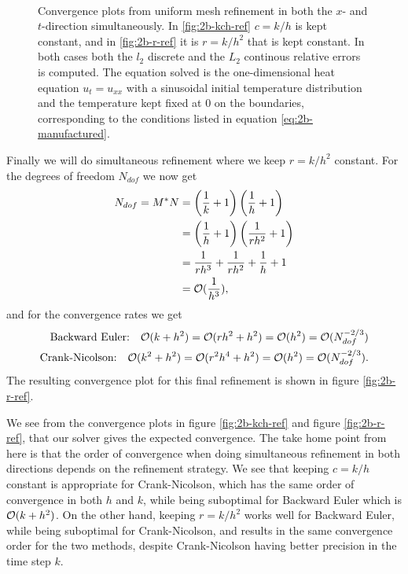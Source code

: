 \begin{figure}
    \centering
    \subfloat[Convergence plots from uniform refinement with constant $c=k/h$.]{
        
        \label{fig:2b-kch-ref}
    } \\ \medskip
    \subfloat[Convergence plots from uniform refinement with constant $r=k/h^2$.]{
        
        \label{fig:2b-r-ref}
    }
    \caption{
        Convergence plots from uniform mesh refinement in both the $x$- and $t$-direction simultaneously. 
        In \ref{fig:2b-kch-ref} $c=k/h$ is kept constant, 
        and in \ref{fig:2b-r-ref} it is $r=k/h^2$ that is kept constant. 
        In both cases both the $l_2$ discrete and the $L_2$ continous relative errors is computed. 
        The equation solved is the one-dimensional heat equation $u_t=u_{xx}$ 
        with a sinusoidal initial temperature distribution and the temperature kept fixed at $0$ 
        on the boundaries, 
        corresponding to the conditions listed in equation \eqref{eq:2b-manufactured}. 
    }
    \label{fig:2b-kch-r-ref}
\end{figure}

Finally we will do simultaneous refinement where we keep $r=k/h^2$ constant. 
For the degrees of freedom $N_{dof}$ we now get 
\begin{equation*}
\begin{split}
    N_{dof} = M^* N & = \left(\frac{1}{k}+1\right)\left(\frac{1}{h}+1\right)
    \\ & = \left(\frac{1}{h}+1\right)\left(\frac{1}{rh^2}+1\right)
    \\ & = \frac{1}{rh^3} + \frac{1}{rh^2} + \frac{1}{h} + 1 
    \\ & = \mathcal{O}(\frac{1}{h^3}), 
\end{split}
\end{equation*}
and for the convergence rates we get 
\begin{equation*}
\begin{split}
    \text{Backward Euler:} \quad \mathcal{O}(k+h^2) = \mathcal{O}(rh^2+h^2) = \mathcal{O}(h^2) = \mathcal{O}(N_{dof}^{-2/3})\\
    \text{Crank-Nicolson:} \quad \mathcal{O}(k^2+h^2) = \mathcal{O}(r^2 h^4+h^2) = \mathcal{O}(h^2) = \mathcal{O}(N_{dof}^{-2/3}). 
\end{split}
\end{equation*}
The resulting convergence plot for this final refinement is shown in figure \ref{fig:2b-r-ref}. 

We see from the convergence plots in figure \ref{fig:2b-kch-ref} and figure \ref{fig:2b-r-ref}, 
that our solver gives the expected convergence. 
The take home point from here is that the order of convergence when doing simultaneous refinement in both directions depends on the refinement strategy. 
We see that keeping $c=k/h$ constant is appropriate for Crank-Nicolson, 
which has the same order of convergence in both $h$ and $k$, 
while being suboptimal for Backward Euler which is $\mathcal{O}(k + h^2)$. 
On the other hand, keeping $r=k/h^2$ works well for Backward Euler, 
while being suboptimal for Crank-Nicolson, 
and results in the same convergence order for the two methods, 
despite Crank-Nicolson having better precision in the time step $k$. 

